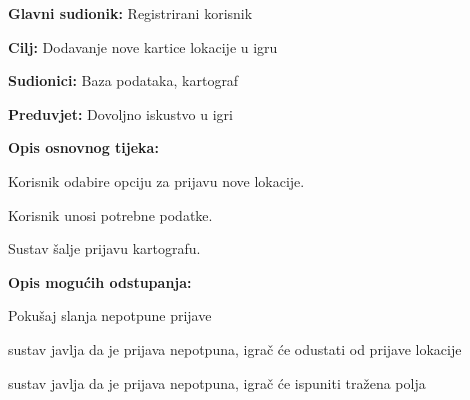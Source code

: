 	\noindent {}
	\begin{packed_item}
		
		\item \textbf{Glavni sudionik: }Registrirani korisnik
		\item  \textbf{Cilj:} Dodavanje nove kartice lokacije u igru
		\item  \textbf{Sudionici:} Baza podataka, kartograf
		\item  \textbf{Preduvjet:} Dovoljno iskustvo u igri
		\item  \textbf{Opis osnovnog tijeka:}
		
		\item[] \begin{packed_enum}
			
			\item Korisnik odabire opciju za prijavu nove lokacije.
			\item Korisnik unosi potrebne podatke.
			\item Sustav šalje prijavu kartografu.
		\end{packed_enum}
	\item  \textbf{Opis mogućih odstupanja:}
	
	\item[] \begin{packed_item}
		
		\item[1.a] Pokušaj slanja nepotpune prijave
		\item[] \begin{packed_enum}
			
			\item  sustav javlja da je prijava nepotpuna, igrač će odustati od prijave lokacije 
			\item  sustav javlja da je prijava nepotpuna, igrač će ispuniti tražena polja
			
		\end{packed_enum}
		
	\end{packed_item}
	\end{packed_item}

